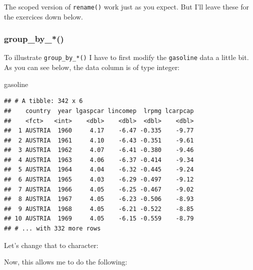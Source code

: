 \documentclass[]{gitbook}
\newenvironment{Shaded}{\begin{snugshade}}{\end{snugshade}}
\newcommand{\DataTypeTok}[1]{\textcolor[rgb]{0.13,0.29,0.53}{#1}}
\newcommand{\KeywordTok}[1]{\textcolor[rgb]{0.13,0.29,0.53}{\textbf{#1}}}
\newcommand{\NormalTok}[1]{#1}
\newcommand{\OperatorTok}[1]{\textcolor[rgb]{0.81,0.36,0.00}{\textbf{#1}}}
\newcommand{\StringTok}[1]{\textcolor[rgb]{0.31,0.60,0.02}{#1}}
\begin{document}
The scoped version of \texttt{rename()} work just as you expect. But I'll leave these for the exercices
down below.

\hypertarget{group_by_}{%
\subsubsection{group\_by\_*()}\label{group_by_}}

To illustrate \texttt{group\_by\_*()} I have to first modify the \texttt{gasoline} data a little bit. As you can
see below, the data column is of type integer:

\begin{Shaded}
\begin{Highlighting}[]
\NormalTok{gasoline}
\end{Highlighting}
\end{Shaded}

\begin{verbatim}
## # A tibble: 342 x 6
##    country  year lgaspcar lincomep  lrpmg lcarpcap
##    <fct>   <int>    <dbl>    <dbl>  <dbl>    <dbl>
##  1 AUSTRIA  1960     4.17    -6.47 -0.335    -9.77
##  2 AUSTRIA  1961     4.10    -6.43 -0.351    -9.61
##  3 AUSTRIA  1962     4.07    -6.41 -0.380    -9.46
##  4 AUSTRIA  1963     4.06    -6.37 -0.414    -9.34
##  5 AUSTRIA  1964     4.04    -6.32 -0.445    -9.24
##  6 AUSTRIA  1965     4.03    -6.29 -0.497    -9.12
##  7 AUSTRIA  1966     4.05    -6.25 -0.467    -9.02
##  8 AUSTRIA  1967     4.05    -6.23 -0.506    -8.93
##  9 AUSTRIA  1968     4.05    -6.21 -0.522    -8.85
## 10 AUSTRIA  1969     4.05    -6.15 -0.559    -8.79
## # ... with 332 more rows
\end{verbatim}

Let's change that to character:

\begin{Shaded}
\end{Shaded}

Now, this allows me to do the following:

\begin{Shaded}
\end{Shaded}
\end{document}
